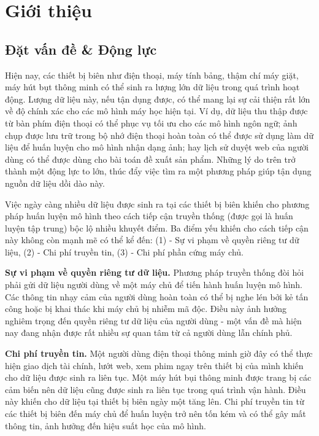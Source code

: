 \chapter{Giới thiệu}
\label{Chapter1}

\section{Đặt vấn đề \& Động lực}

Hiện nay, các thiết bị biên như điện thoại, máy tính bảng, thậm chí máy giặt, máy hút bụt thông minh có thể sinh ra lượng lớn dữ liệu trong quá trình hoạt động. Lượng dữ liệu này, nếu tận dụng được, có thể mang lại sự cải thiện rất lớn về độ chính xác cho các mô hình máy học hiện tại. Ví dụ, dữ liệu thu thập được từ bàn phím điện thoại có thể phục vụ tối ưu cho các mô hình ngôn ngữ; ảnh chụp được lưu trữ trong bộ nhớ điện thoại hoàn toàn có thể được sử dụng làm dữ liệu để huấn luyện cho mô hình nhận dạng ảnh; hay lịch sử duyệt web của người dùng có thể được dùng cho bài toán đề xuất sản phẩm. Những lý do trên trở thành một động lực to lớn, thúc đẩy việc tìm ra một phương pháp giúp tận dụng nguồn dữ liệu dồi dào này.

Việc ngày càng nhiều dữ liệu được sinh ra tại các thiết bị biên khiến cho phương pháp huấn luyện mô hình theo cách tiếp cận truyền thống (được gọi là huấn luyện tập trung) bộc lộ nhiều khuyết điểm. Ba điểm yếu khiến cho cách tiếp cận này không còn mạnh mẽ có thể kể đến: (1) - Sự vi phạm về quyền riêng tư dữ liệu, (2) - Chi phí truyền tin, (3) - Chi phí phần cứng máy chủ.

\textbf{Sự vi phạm về quyền riêng tư dữ liệu.} Phương pháp truyền thống đòi hỏi phải gửi dữ liệu người dùng về một máy chủ để tiến hành huấn luyện mô hình. Các thông tin nhạy cảm của người dùng hoàn toàn có thể bị nghe lén bởi kẻ tấn công hoặc bị khai thác khi máy chủ bị nhiễm mã độc. Điều này ảnh hưởng nghiêm trọng đến quyền riêng tư dữ liệu của người dùng - một vấn đề mà hiện nay đang nhận được rất nhiều sự quan tâm từ cả người dùng lẫn chính phủ.

\textbf{Chi phí truyền tin.} Một người dùng điện thoại thông minh giờ đây có thể thực hiện giao dịch tài chính, lướt web, xem phim ngay trên thiết bị của mình khiến cho dữ liệu được sinh ra liên tục. Một máy hút bụi thông minh được trang bị các cảm biến nên dữ liệu cũng được sinh ra liên tục trong quá trình vận hành. Điều này khiến cho dữ liệu tại thiết bị biên ngày một tăng lên. Chi phí truyền tin từ các thiết bị biên đến máy chủ để huấn luyện trở nên tốn kém và có thể gây mất thông tin, ảnh hưởng đến hiệu suất học của mô hình.

